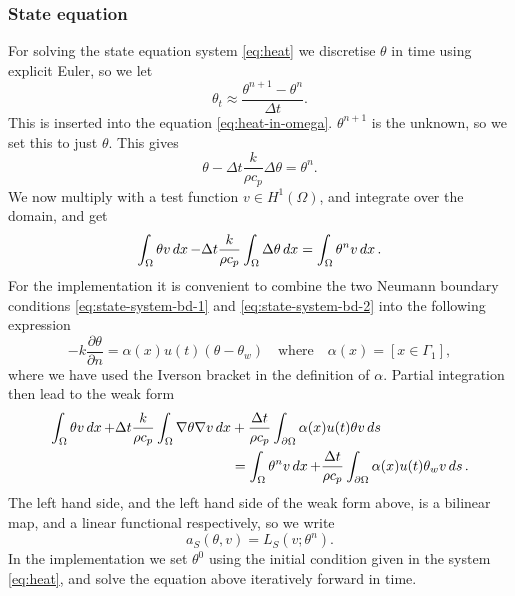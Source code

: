 \subsubsection{State equation}

For solving the state equation system \eqref{eq:heat} we discretise $\theta$ in time using explicit Euler, so we let
\begin{equation*}
    \theta_t \approx \frac{\theta^{n+1} - \theta^n}{\Delta t}.
\end{equation*}
This is inserted into the equation \eqref{eq:heat-in-omega}. $\theta^{n+1}$ is the unknown, so we set this to just $\theta$. This gives
\begin{equation*}
    \theta - \Delta t\frac{k}{\rho c_p}\Delta \theta = \theta^n.
\end{equation*}
We now multiply with a test function $v\in H^1(\Omega)$, and integrate over the domain, and get
\begin{equation*}
    \int_\Omega \theta v \mathop{dx} - \Delta t\frac{k}{\rho c_p}\int_\Omega \Delta\theta\mathop{dx} = \int_\Omega \theta^n v\mathop{dx}.
\end{equation*}
For the implementation it is convenient to combine the two Neumann boundary conditions \eqref{eq:state-system-bd-1} and \eqref{eq:state-system-bd-2} into the following expression
\begin{equation*}
    -k\frac{\partial \theta}{\partial n} = \alpha(x)u(t)(\theta - \theta_w) \quad\text{where}\quad \alpha(x) = [x\in\Gamma_1],
\end{equation*}
where we have used the Iverson bracket in the definition of $\alpha$. Partial integration then lead to the weak form
\begin{equation*}
\begin{aligned}
    \int_\Omega \theta v\mathop{dx} + \Delta t\frac{k}{\rho c_p}\int_\Omega\nabla\theta\nabla v\mathop{dx} &+ \frac{\Delta t}{\rho c_p}\int_{\partial\Omega}\alpha(x)u(t)\theta v\mathop{ds} \\
    &= \int_\Omega\theta^n v\mathop{dx} + \frac{\Delta t}{\rho c_p}\int_{\partial\Omega}\alpha(x)u(t)\theta_w v\mathop{ds}.
\end{aligned}
\end{equation*}
The left hand side, and the left hand side of the weak form above, is a bilinear map, and a linear functional respectively, so we write
\begin{equation*}
    a_S(\theta, v) = L_S(v; \theta^n).
\end{equation*}
In the implementation we set $\theta^0$ using the initial condition given in the system \eqref{eq:heat}, and solve the equation above iteratively forward in time.


